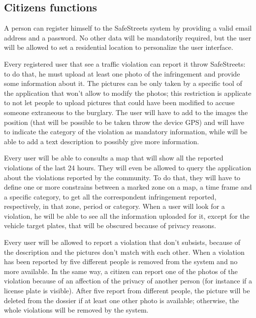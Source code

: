\documentclass[../RASD.tex]{subfiles}
\begin{document}
    \subsection{Citizens functions}\label{subsec:citizen-functions}
    A person can register himself to the SafeStreets system by providing a valid email address and a password. No other data will be mandatorily required, but the user will be allowed to set a residential location to personalize the user interface.

    Every registered user that see a traffic violation can report it throw SafeStreets: to do that, he must upload at least one photo of the infringement and provide some information about it. The pictures can be only taken by a specific tool of the application that won't allow to modify the photos; this restriction is applicate to not let people to upload pictures that could have been modified to accuse someone extraneous to the burglary. The user will have to add to the images the position (that will be possible to be taken throw the device GPS) and will have to indicate the category of the violation as mandatory information, while will be able to add a text description to possibly give more information.

    Every user will be able to consults a map that will show all the reported violations of the last 24 hours. They will even be allowed to query the application about the violations reported by the community. To do that, they will have to define one or more constrains between a marked zone on a map, a time frame and a specific category, to get all the correspondent infringement reported, respectively, in that zone, period or category. When a user will look for a violation, he will be able to see all the information uploaded for it, except for the vehicle target plates, that will be obscured because of privacy reasons.

    Every user will be allowed to report a violation that don’t subsists, because of the description and the pictures don’t match with each other. When a violation has been reported by five different people is removed from the system and no more available. In the same way, a citizen can report one of the photos of the violation because of an affection of the privacy of another person (for instance if a license plate is visible). After five report from different people, the picture will be deleted from the dossier if at least one other photo is available; otherwise, the whole violations will be removed by the system.
\end{document}
